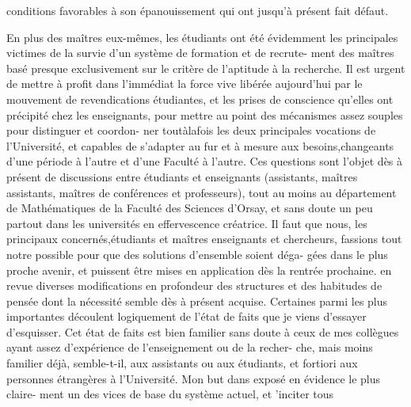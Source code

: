 
conditions favorables à son épanouissement qui ont jusqu'à présent fait
défaut.

En plus des maîtres eux-mêmes, les étudiants ont été évidemment les
principales victimes de la survie d'un système de formation et de recrute-%
ment des maîtres basé presque exclusivement sur le critère de l'aptitude
à la recherche. Il est urgent de mettre à profit dans l'immédiat la force
vive libérée aujourd'hui par le mouvement de revendications étudiantes, et
les prises de conscience qu'elles ont précipité chez les enseignants,
pour mettre au point des mécanismes assez souples pour distinguer et coordon-%
ner toutàlafois les deux principales vocations de l'Université, et capables
de s'adapter au fur et à mesure aux besoins,changeants d'une période à l'autre
et d'une Faculté à l'autre. Ces questions sont l'objet dès à présent de
discussions entre étudiants et enseignants (assistants, maîtres assistants,
maîtres de conférences et professeurs), tout au moins au département de
Mathématiques de la Faculté des Sciences d'Orsay, et sans doute un peu
partout dans les universités en effervescence créatrice. Il faut que nous,
les principaux concernés,étudiants et maîtres enseignants et chercheurs,
fassions tout notre possible pour que des solutions d'ensemble soient déga-%
gées dans le plus proche avenir, et puissent être mises en application dès
la rentrée prochaine.  en revue
 diverses modifications en profondeur des structures et des habitudes de
pensée dont la nécessité  semble dès à présent acquise. Certaines parmi les
plus importantes découlent logiquement de l'état de faits que je viens
d'essayer d'esquisser. Cet état de faits est bien familier sans doute à ceux
de mes collègues ayant assez d'expérience de l'enseignement ou de la recher-%
che, mais moins familier déjà, semble-t-il, aux assistants ou aux étudiants,
et  fortiori aux personnes étrangères à l'Université. Mon but dans   exposé
  en évidence le plus claire-%
ment  un des vices de base du système actuel, et 'inciter tous

